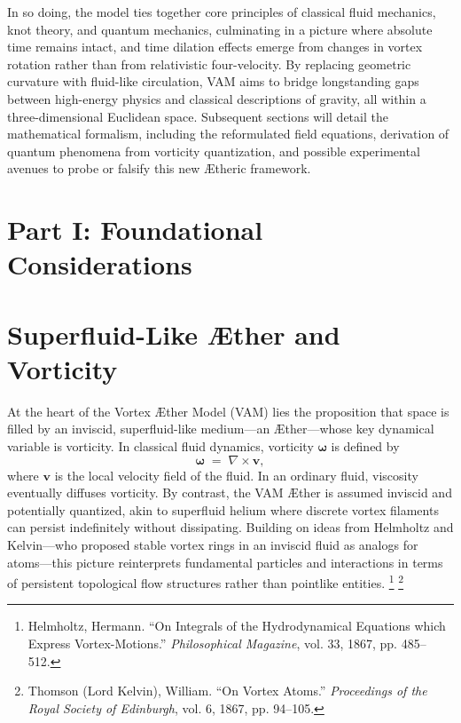 \documentclass[aps,preprint,superscriptaddress]{revtex4-2}
\begin{document}
        In so doing, the model ties together core principles of classical fluid mechanics, knot theory, and quantum mechanics, culminating in a picture where absolute time remains intact, and time dilation effects emerge from changes in vortex rotation rather than from relativistic four-velocity. By replacing geometric curvature with fluid-like circulation, VAM aims to bridge longstanding gaps between high-energy physics and classical descriptions of gravity, all within a three-dimensional Euclidean space. Subsequent sections will detail the mathematical formalism, including the reformulated field equations, derivation of quantum phenomena from vorticity quantization, and possible experimental avenues to probe or falsify this new Ætheric framework.



    \section*{Part I: Foundational Considerations}\label{sec:part-1}
    \section{Superfluid-Like Æther and Vorticity}

    At the heart of the Vortex Æther Model (VAM) lies the proposition that space is filled by an inviscid, superfluid-like medium—an Æther—whose key dynamical variable is vorticity. In classical fluid dynamics, vorticity \(\boldsymbol{\omega}\) is defined by
    \[
        \boldsymbol{\omega} \;=\; \nabla \times \mathbf{v},
    \]
    where \(\mathbf{v}\) is the local velocity field of the fluid. In an ordinary fluid, viscosity eventually diffuses vorticity. By contrast, the VAM Æther is assumed inviscid and potentially quantized, akin to superfluid helium where discrete vortex filaments can persist indefinitely without dissipating. Building on ideas from Helmholtz and Kelvin—who proposed stable vortex rings in an inviscid fluid as analogs for atoms—this picture reinterprets fundamental particles and interactions in terms of persistent topological flow structures rather than pointlike entities.
    \footnote{Helmholtz, Hermann. “On Integrals of the Hydrodynamical Equations which Express Vortex-Motions.” \textit{Philosophical Magazine}, vol. 33, 1867, pp. 485–512.}
    \footnote{Thomson (Lord Kelvin), William. “On Vortex Atoms.” \textit{Proceedings of the Royal Society of Edinburgh}, vol. 6, 1867, pp. 94–105.}
\end{document}
